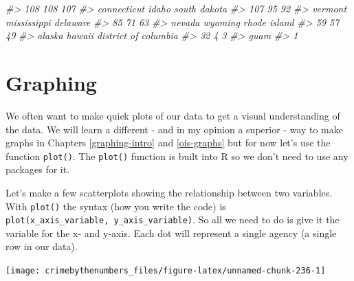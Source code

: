 \documentclass[
]{krantz}
\makeatletter
\newenvironment{Shaded}{\begin{snugshade}}{\end{snugshade}}
\newcommand{\CommentTok}[1]{\textcolor[rgb]{0.37,0.37,0.37}{\textit{#1}}}
\newcommand{\FunctionTok}[1]{\textcolor[rgb]{0,0,0}{#1}}
\newcommand{\NormalTok}[1]{#1}
\newcommand{\SpecialCharTok}[1]{\textcolor[rgb]{0,0,0}{#1}}
\newenvironment{kframe}{%
\medskip{}
\setlength{\fboxsep}{.8em}
 \def\at@end@of@kframe{}%
 \ifinner\ifhmode%
  \def\at@end@of@kframe{\end{minipage}}%
  \begin{minipage}{\columnwidth}%
 \fi\fi%
 \def\FrameCommand##1{\hskip\@totalleftmargin \hskip-\fboxsep
 \colorbox{shadecolor}{##1}\hskip-\fboxsep
     \hskip-\linewidth \hskip-\@totalleftmargin \hskip\columnwidth}%
 \MakeFramed {\advance\hsize-\width
   \@totalleftmargin\z@ \linewidth\hsize
   \@setminipage}}%
 {\par\unskip\endMakeFramed%
 \at@end@of@kframe}
\renewenvironment{Shaded}{\begin{kframe}}{\end{kframe}}
\makeatother
\begin{document}
\begin{Shaded}
\begin{Highlighting}[]
\CommentTok{\#\textgreater{}                  108                  108                  107 }
\CommentTok{\#\textgreater{}          connecticut                idaho         south dakota }
\CommentTok{\#\textgreater{}                  107                   95                   92 }
\CommentTok{\#\textgreater{}              vermont          mississippi             delaware }
\CommentTok{\#\textgreater{}                   85                   71                   63 }
\CommentTok{\#\textgreater{}               nevada              wyoming         rhode island }
\CommentTok{\#\textgreater{}                   59                   57                   49 }
\CommentTok{\#\textgreater{}               alaska               hawaii district of columbia }
\CommentTok{\#\textgreater{}                   32                    4                    3 }
\CommentTok{\#\textgreater{}                 guam }
\CommentTok{\#\textgreater{}                    1}
\end{Highlighting}
\end{Shaded}

\hypertarget{graphing-1}{%
\section{Graphing}\label{graphing-1}}

We often want to make quick plots of our data to get a visual understanding of the data. We will learn a different - and in my opinion a superior - way to make graphs in Chapters \ref{graphing-intro} and \ref{ois-graphs} but for now let's use the function \texttt{plot()}. The \texttt{plot()} function is built into R so we don't need to use any packages for it.

Let's make a few scatterplots showing the relationship between two variables. With \texttt{plot()} the syntax (how you write the code) is \texttt{plot(x\_axis\_variable,\ y\_axis\_variable)}. So all we need to do is give it the variable for the x- and y-axis. Each dot will represent a single agency (a single row in our data).

\begin{Shaded}
\end{Shaded}

\begin{center}\texttt{[image: crimebythenumbers\_files/figure-latex/unnamed-chunk-236-1]} \end{center}
\end{document}
